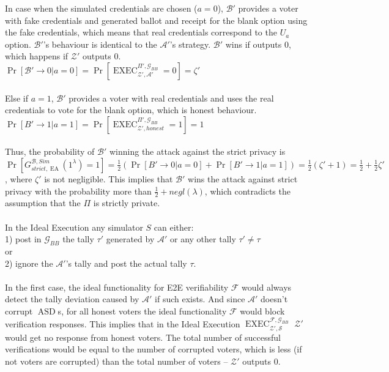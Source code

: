 \documentclass[12pt]{article}
\DeclareMathOperator{\exec}{EXEC}
\DeclareMathOperator{\asd}{ASD}
\DeclareMathOperator{\ea}{EA}
\begin{document}
In case when the simulated credentials are chosen ($a=0$), $\mathcal{B'}$ provides a voter with fake credentials and generated ballot and receipt for the blank option using the fake credentials, which means that real credentials correspond to the $U_a$ option. $\mathcal{B'}$'s behaviour is identical to the $\mathcal{A'}$'s strategy. $\mathcal{B'}$ wins if outputs 0, which happens if  $\mathcal{Z'}$ outputs 0. $\Pr[\mathcal{B}'\rightarrow 0| a=0 ] = \Pr[\exec_{\mathcal{Z'},\mathcal{A'}}^{\Pi', \mathcal{G}_{BB}}=0] = \zeta'$\\\\
%
Else if $a=1$, $\mathcal{B'}$ provides a voter with real credentials and uses the real credentials to vote for the blank option, which is honest behaviour. $\Pr[B'\rightarrow 1| a=1] =\Pr[\exec_{\mathcal{Z'},honest}^{\Pi', \mathcal{G}_{BB}}=1] = 1$\\\\
%
Thus, the probability of $\mathcal{B'}$  winning the attack against the strict privacy is \\$\Pr[G_{strict,\ea}^{\mathcal{B}, Sim}(1^{\lambda})=1]= \frac{1}{2}(\Pr[B'\rightarrow 0| a=0] + \Pr[B'\rightarrow 1| a=1])  = \frac{1}{2} (\zeta' +1) =  \frac{1}{2}  +  \frac{1}{2} \zeta'$ , where $\zeta'$ is not negligible. This implies that $\mathcal{B'}$ wins the attack against strict privacy with the probability more than $\frac{1}{2} + negl(\lambda)$, which contradicts the assumption that the $\Pi$ is strictly private.\\\\
In the Ideal Execution any simulator $S$ can either:\\
1) post in $\mathcal{G}_{BB}$ the tally $\tau'$ generated by $\mathcal{A'}$ or any other tally  $\tau' \neq \tau$\\ 
or\\
2) ignore the $\mathcal{A'}$'s tally and post the actual tally $\tau$.\\\\
In the first case, the ideal functionality for E2E verifiability  $\mathcal{F}$  would always detect the tally deviation caused by $\mathcal{A'}$ if such exists. And since  $\mathcal{A'}$ doesn't corrupt $\asd$s, for all honest voters the ideal functionality $\mathcal{F}$ would block verification responses. This implies that in the Ideal Execution $\exec_{\mathcal{Z'}, \mathcal{S}}^{\mathcal{F}, \mathcal{G}_{BB}}$ $\mathcal{Z'}$ would get no response from honest voters. The total number of successful verifications would be equal to the number of corrupted voters, which is less (if not voters are corrupted) than the total number of voters -- $\mathcal{Z'}$ outputs 0.  \\\\
\end{document}
